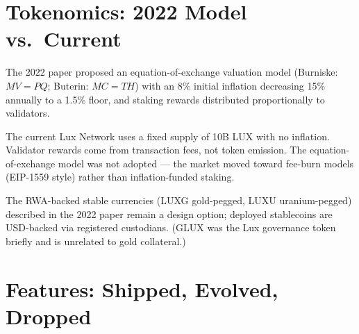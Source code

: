 \documentclass[11pt,a4paper]{article}
\begin{document}
\section{Tokenomics: 2022 Model vs.\ Current}

The 2022 paper proposed an equation-of-exchange valuation model
(Burniske: $MV = PQ$; Buterin: $MC = TH$) with an 8\% initial
inflation decreasing 15\% annually to a 1.5\% floor, and
staking rewards distributed proportionally to validators.

The current Lux Network uses a fixed supply of 10B LUX with no
inflation. Validator rewards come from transaction fees, not
token emission. The equation-of-exchange model was not adopted
--- the market moved toward fee-burn models (EIP-1559 style)
rather than inflation-funded staking.

The RWA-backed stable currencies (LUXG gold-pegged, LUXU
uranium-pegged) described in the 2022 paper remain a design
option; deployed stablecoins are USD-backed via registered
custodians. (GLUX was the Lux governance token briefly and
is unrelated to gold collateral.)

\section{Features: Shipped, Evolved, Dropped}
\end{document}
